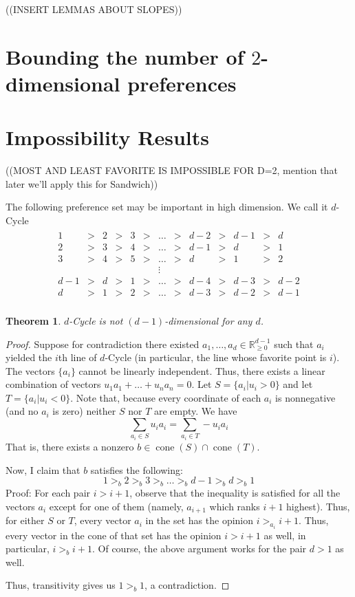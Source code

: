 \documentclass[12pt]{article}
\newtheorem{theorem}{Theorem}
\newcommand{\Rgz}{\mathbb{R}_{\ge 0}}
\DeclareMathOperator*{\cone}{cone}
\newcommand{\1}[1]{\mathds{1}[{#1}]}
\begin{document}
    ((INSERT LEMMAS ABOUT SLOPES))

\section{Bounding the number of $2$-dimensional preferences}

\section{Impossibility Results}

  ((MOST AND LEAST FAVORITE IS IMPOSSIBLE FOR D=2,
  mention that later we'll apply this for Sandwich))

  The following preference set may be important in high dimension.
  We call it $d$-{\sc Cycle}
  \begin{align*}
    \begin{array}{ccccccccccccccccccccccccccccccccccccccccc}
    1 &>& 2 &>& 3 &>&\ldots &>& d-2 &>& d-1 &>& d \\
    2 &>& 3 &>& 4 &>& \ldots &>& d-1 &>& d &>& 1 \\
    3 &>& 4 &>& 5 &>& \ldots &>& d &>& 1 &>& 2 \\
      &&    &&    &&   \vdots \\
    d-1&>&d&>& 1 &>&\ldots &>& d-4 &>& d-3 &>& d-2\\
    d &>& 1 &>& 2 &>& \ldots &>& d-3 &>& d-2 &>& d-1 \\
    \end{array}
  \end{align*}
  \begin{theorem}
    $d$-{\sc Cycle} is not $(d-1)$-dimensional for any $d$.
  \end{theorem}
  \begin{proof}
    Suppose for contradiction there existed
    $a_1,\ldots,a_d\in\Rgz^{d-1}$ such that $a_i$ yielded the $i$th line of
    $d$-{\sc Cycle} (in particular, the line whose favorite point is $i$).
    The vectors $\{a_i\}$ cannot be linearly independent.
    Thus, there exists a linear combination of vectors
    $u_1 a_1 + \ldots + u_n a_n = 0$.
    Let $S = \{a_i | u_i > 0\}$ and let $T = \{a_i | u_i < 0\}$.
    Note that, because every coordinate of each $a_i$ is nonnegative
    (and no $a_i$ is zero) neither $S$ nor $T$ are empty.
    We have
    \[ \sum_{a_i \in S} u_i a_i = \sum_{a_i \in T} -u_i a_i \]
    That is, there exists a nonzero $b\in \cone(S) \cap \cone(T)$.

    Now, I claim that $b$ satisfies the following:
    \[ 1 >_b 2 >_b 3 >_b \ldots >_b d-1 >_b d >_b 1 \]
    Proof: For each pair $i > i+1$,
    observe that the inequality is satisfied for all the vectors $a_i$ except
    for one of them (namely, $a_{i+1}$ which ranks $i+1$ highest).
    Thus, for either $S$ or $T$, every vector $a_i$ in the set has the opinion
    $i >_{a_i} i+1$. Thus, every vector in the cone of that set
    has the opinion $i > i+1$ as well, in particular, $i >_b i+1$.
    Of course, the above argument works for the pair $d>1$ as well.

    Thus, transitivity gives us $1>_b 1$, a contradiction.
  \end{proof}
\end{document}
